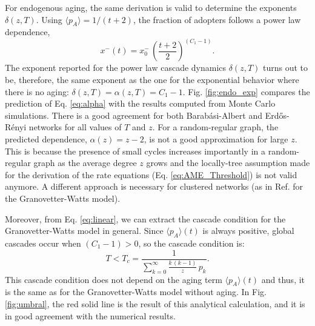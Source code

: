 For endogenous aging, the same derivation is valid to determine the exponents $\delta(z,T)$. Using $\langle p_A \rangle = 1/(t+2)$, the fraction of adopters follows a power law dependence,
\begin{equation}
    \label{rho_endo}
    x^{-}(t) = x^{-}_{0} \, \left( \frac{t+2}{2} \right)^{(C_1 - 1)}.
\end{equation}
The exponent reported for the power law cascade dynamics $\delta(z,T)$ turns out to be, therefore, the same exponent as the one for the exponential behavior where there is no aging:  $\delta(z,T)= \alpha(z,T)= C_{1} - 1$. Fig. \ref{fig:endo_exp} compares the prediction of Eq. \eqref{eq:alpha} with the results computed from Monte Carlo simulations. There is a good agreement for both Barab\'asi-Albert and Erd\H{o}s-R\'enyi networks for all values of $T$ and $z$. For a random-regular graph, the predicted dependence, $\alpha(z) = z - 2$, is not a good approximation for large $z$. This is because the presence of small cycles increases importantly in a random-regular graph as the average degree $z$ grows \cite{wormald_1999} and the locally-tree assumption made for the derivation of the rate equations (Eq. \eqref{eq:AME_Threshold}) is not valid anymore. A different approach is necessary for clustered networks (as in Ref.\cite{Leah2022} for the Granovetter-Watts model). 

Moreover, from Eq. \eqref{eq:linear}, we can extract the cascade condition for the Granovetter-Watts model in general. Since $\langle p_A \rangle(t)$ is always positive, global cascades occur when $(C_1 - 1) > 0 $, so the cascade condition is:
\begin{equation}
    \label{eq:umbral}
    T < T_c = \frac{1}{\sum_{k=0}^{\infty} \frac{k \, (k - 1)}{z}\, p_k}.
\end{equation}
This cascade condition does not depend on the aging term $\langle p_A \rangle(t)$ and thus, it is the same as for the Granovetter-Watts model without aging. In Fig. \ref{fig:umbral}, the red solid line is the result of this analytical calculation, and it is in good agreement with the numerical results. 

